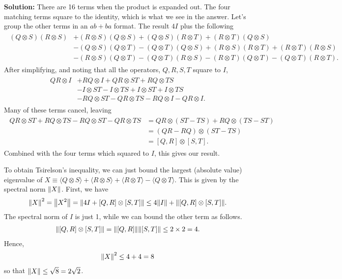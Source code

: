 \documentclass{book}
\begin{document}
    \textbf{Solution:} There are 16 terms when the product is expanded out. The four matching terms square to the identity, which is what we see in the answer. Let's group the other terms in an $ab + ba$ format. The result $4I$ plus the following
    \begin{align}
    \begin{aligned}
        (Q\otimes S) (R\otimes S) &+ (R\otimes S) (Q\otimes S) + (Q\otimes S)(R\otimes T) + (R\otimes T)(Q\otimes S) \\
        & -(Q\otimes S)(Q\otimes T) - (Q\otimes T)(Q\otimes S) + (R\otimes S)(R\otimes T) + (R\otimes T)(R\otimes S) \\
        & -(R\otimes S)(Q\otimes T) - (Q\otimes T)(R\otimes S) - (R\otimes T)(Q\otimes T) - (Q\otimes T)(R\otimes T).
    \end{aligned}
    \end{align}
    After simplifying, and noting that all the operators, $Q, R, S, T$ square to $I$,
    \begin{align}
    \begin{aligned}
        QR \otimes I &+ RQ \otimes I + QR \otimes ST + RQ \otimes TS \\
        &-I \otimes ST - I \otimes TS + I \otimes ST + I \otimes TS \\
        &-RQ \otimes ST - QR \otimes TS - RQ \otimes I - QR \otimes I.
    \end{aligned}
    \end{align}
    Many of these terms cancel, leaving
    \begin{align}
    \begin{aligned}
        QR \otimes ST + RQ \otimes TS - RQ \otimes ST - QR \otimes TS &= QR \otimes (ST - TS) + RQ \otimes (TS - ST)\\
        &= (QR - RQ) \otimes (ST - TS) \\
        &= [Q,R] \otimes [S,T].
    \end{aligned}
    \end{align}
    Combined with the four terms which squared to $I$, this gives our result.

    To obtain Tsirelson's inequality, we can just bound the largest (absolute value) eigenvalue of $X \equiv \langle Q \otimes S\rangle + \langle R \otimes S\rangle + \langle R \otimes T\rangle - \langle Q \otimes T\rangle$. This is given by the spectral norm $\norm{X}$. First, we have
    \begin{align}
        \norm{X}^2 = \norm{X^2} = \norm{4I + [Q,R] \otimes [S,T]} \leq 4 \norm{I} + \norm{[Q,R] \otimes [S,T]}.
    \end{align}
    The spectral norm of $I$ is just 1, while we can bound the other term as follows.
    \begin{align}
        \norm{[Q,R] \otimes [S,T]} = \norm{[Q,R]} \norm{[S,T]} \leq 2 \times 2 = 4.
    \end{align}
    Hence,
    \begin{align}
        \norm{X}^2 \leq 4 + 4 = 8
    \end{align}
    so that $\norm{X} \leq \sqrt{8} = 2 \sqrt{2}$.
\end{document}
